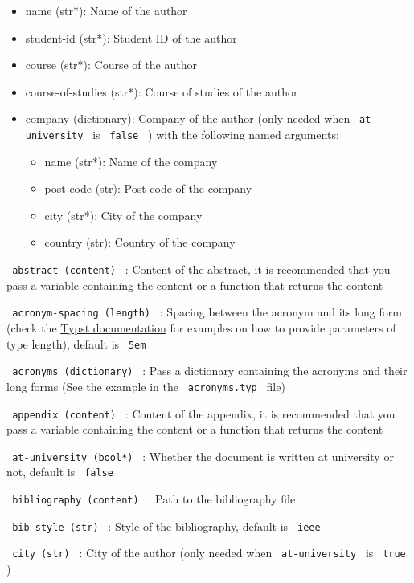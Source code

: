 \begin{itemize}
\tightlist
\item
  name (str*): Name of the author
\item
  student-id (str*): Student ID of the author
\item
  course (str*): Course of the author
\item
  course-of-studies (str*): Course of studies of the author
\item
  company (dictionary): Company of the author (only needed when
  \texttt{\ at-university\ } is \texttt{\ false\ } ) with the following
  named arguments:

  \begin{itemize}
  \tightlist
  \item
    name (str*): Name of the company
  \item
    post-code (str): Post code of the company
  \item
    city (str*): City of the company
  \item
    country (str): Country of the company
  \end{itemize}
\end{itemize}

\texttt{\ abstract\ (content)\ } : Content of the abstract, it is
recommended that you pass a variable containing the content or a
function that returns the content

\texttt{\ acronym-spacing\ (length)\ } : Spacing between the acronym and
its long form (check the
\href{https://typst.app/docs/reference/layout/length/}{Typst
documentation} for examples on how to provide parameters of type
length), default is \texttt{\ 5em\ }

\texttt{\ acronyms\ (dictionary)\ } : Pass a dictionary containing the
acronyms and their long forms (See the example in the
\texttt{\ acronyms.typ\ } file)

\texttt{\ appendix\ (content)\ } : Content of the appendix, it is
recommended that you pass a variable containing the content or a
function that returns the content

\texttt{\ at-university\ (bool*)\ } : Whether the document is written at
university or not, default is \texttt{\ false\ }

\texttt{\ bibliography\ (content)\ } : Path to the bibliography file

\texttt{\ bib-style\ (str)\ } : Style of the bibliography, default is
\texttt{\ ieee\ }

\texttt{\ city\ (str)\ } : City of the author (only needed when
\texttt{\ at-university\ } is \texttt{\ true\ } )


